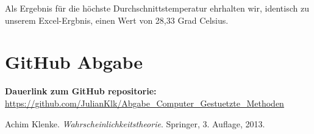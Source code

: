 \documentclass[a4paper, 12pt]{article}
\begin{document}
Als Ergebnis für die höchste Durchschnittstemperatur ehrhalten wir, identisch zu unserem Excel-Ergbnis, einen Wert von 28,33 Grad Celsius.

\newpage
\section{GitHub Abgabe}
\textbf{Dauerlink zum GitHub repositorie:} \newline
\url{https://github.com/JulianKlk/Abgabe_Computer_Gestuetzte_Methoden}

\newpage
\begin{thebibliography}{9}
Achim Klenke. \textit{Wahrscheinlichkeitstheorie}. Springer, 3. Auflage, 2013.
\end{thebibliography}
\end{document}

